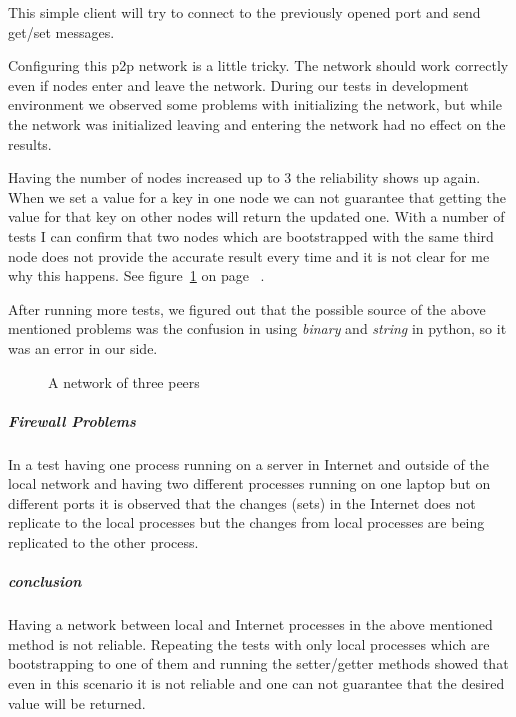 This simple client will try to connect to the previously opened port and send get/set messages.

Configuring this p2p network is a little tricky. The network should work correctly even if nodes enter
and leave the network. During our tests in development environment we observed some problems with initializing the network,
but while the network was initialized leaving and entering the network had no effect on the results.

Having the number of nodes increased up to 3 the reliability shows up again. When we set a value for a key 
in one node we can not guarantee that getting the value for that key on other nodes will return the updated one.
With a number of tests I can confirm that two nodes which are bootstrapped with the same third node does not
provide the accurate result every time and it is not clear for me why this happens. See figure~\ref{fig:threepeers} on page ~\pageref{fig:threepeers}.

After running more tests, we figured out that the possible source of the above mentioned problems 
was the confusion in using \textit{binary} and \textit{string} in python, so it was an error in our side.

\begin{figure}
\centering
{}
\caption{A network of three peers}
\label{fig:threepeers}
\end{figure}


\subparagraph{Firewall Problems}
In a test having one process running on a server in Internet and outside of the local network and having two
different processes running on one laptop but on different ports it is observed that the changes (sets) in the
Internet does not replicate to the local processes but the changes from local processes are being replicated to the other process.

\subparagraph{conclusion}
Having a network between local and Internet processes in the above mentioned method is not reliable. 
Repeating the tests with only local processes which are bootstrapping to one of them and running the setter/getter
methods showed that even in this scenario it is not reliable and one can not guarantee that the desired value will be returned.


